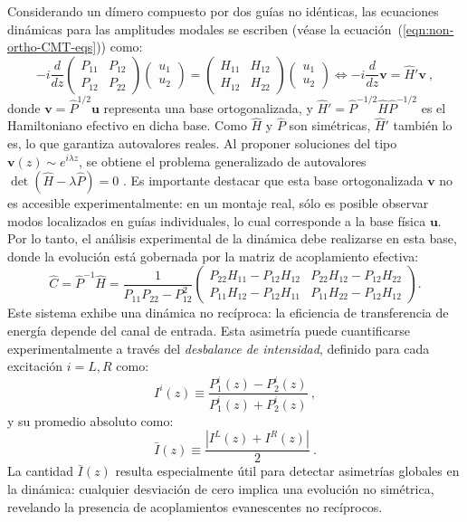 Considerando un dímero compuesto por dos guías no idénticas, las ecuaciones dinámicas para las amplitudes modales se escriben (véase la ecuación~(\ref{eqn:non-ortho-CMT-eqs})) como:
\begin{equation}
	-i
	\frac{d}{dz}
	\begin{pmatrix}
		P_{11} & P_{12} \\
		P_{12} & P_{22}
	\end{pmatrix}
	\begin{pmatrix}
		u_1 \\
		u_2
	\end{pmatrix}
	=
	\begin{pmatrix}
		H_{11} & H_{12} \\
		H_{12} & H_{22}
	\end{pmatrix}
	\begin{pmatrix}
		u_1 \\
		u_2
	\end{pmatrix}
	\iff
	-i\frac{d}{dz}\textbf{v} = \hat{H}' \textbf{v} \ ,
\end{equation}
donde \( \textbf{v} = \hat{P}^{1/2} \textbf{u} \) representa una base ortogonalizada, y \( \hat{H}' = \hat{P}^{-1/2} \hat{H} \hat{P}^{-1/2} \) es el Hamiltoniano efectivo en dicha base. Como \( \hat{H} \) y \( \hat{P} \) son simétricas, \( \hat{H}' \) también lo es, lo que garantiza autovalores reales. Al proponer soluciones del tipo \( \textbf{v}(z) \sim e^{i\lambda z} \), se obtiene el problema generalizado de autovalores $\det(\hat{H} - \lambda \hat{P}) = 0$ .
Es importante destacar que esta base ortogonalizada \( \textbf{v} \) no es accesible experimentalmente: en un montaje real, sólo es posible observar modos localizados en guías individuales, lo cual corresponde a la base física \( \textbf{u} \). Por lo tanto, el análisis experimental de la dinámica debe realizarse en esta base, donde la evolución está gobernada por la matriz de acoplamiento efectiva:
\begin{equation*}
	\hat{C} = \hat{P}^{-1} \hat{H} = \frac{1}{P_{11}P_{22} - P_{12}^2}
	\begin{pmatrix}
		P_{22}H_{11} - P_{12}H_{12} & P_{22}H_{12} - P_{12}H_{22} \\
		P_{11}H_{12} - P_{12}H_{11} & P_{11}H_{22} - P_{12}H_{12}
	\end{pmatrix}.
\end{equation*}
Este sistema exhibe una dinámica no recíproca: la eficiencia de transferencia de energía depende del canal de entrada. Esta asimetría puede cuantificarse experimentalmente a través del \textit{desbalance de intensidad}, definido para cada excitación \( i = L, R \) como:
\begin{equation*}
	I^i(z) \equiv \frac{P^i_1(z) - P^i_2(z)}{P^i_1(z) + P^i_2(z)} \ ,
\end{equation*}
y su promedio absoluto como:
\begin{equation*}
	\bar{I}(z) \equiv \frac{|I^L(z) + I^R(z)|}{2} \ .
\end{equation*}
La cantidad \( \bar{I}(z) \) resulta especialmente útil para detectar asimetrías globales en la dinámica: cualquier desviación de cero implica una evolución no simétrica, revelando la presencia de acoplamientos evanescentes no recíprocos.

